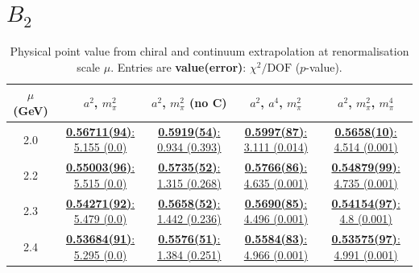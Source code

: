 \documentclass[12pt]{extarticle}
\begin{document}
\section{$B_2$}
\begin{table}[h!]
\begin{center}
\begin{tabular}{|c|c|c|c|c|}
\hline
$\mu$ (GeV) & $a^2$, $m_\pi^2$& $a^2$, $m_\pi^2$ (no C)& $a^2$, $a^4$, $m_\pi^2$& $a^2$, $m_\pi^2$, $m_\pi^4$\\
\hline
2.0& \hyperlink{VVmAA/SUSY/a2m2_20.pdf.1}{\textbf{0.56711(94)}: 5.155 (0.0)} & \hyperlink{VVmAA/SUSY/a2m2noC_20.pdf.1}{\textbf{0.5919(54)}: 0.934 (0.393)} & \hyperlink{VVmAA/SUSY/a2a4m2_20.pdf.1}{\textbf{0.5997(87)}: 3.111 (0.014)} & \hyperlink{VVmAA/SUSY/a2m2m4_20.pdf.1}{\textbf{0.5658(10)}: 4.514 (0.001)}\\
2.2& \hyperlink{VVmAA/SUSY/a2m2_22.pdf.1}{\textbf{0.55003(96)}: 5.515 (0.0)} & \hyperlink{VVmAA/SUSY/a2m2noC_22.pdf.1}{\textbf{0.5735(52)}: 1.315 (0.268)} & \hyperlink{VVmAA/SUSY/a2a4m2_22.pdf.1}{\textbf{0.5766(86)}: 4.635 (0.001)} & \hyperlink{VVmAA/SUSY/a2m2m4_22.pdf.1}{\textbf{0.54879(99)}: 4.735 (0.001)}\\
2.3& \hyperlink{VVmAA/SUSY/a2m2_23.pdf.1}{\textbf{0.54271(92)}: 5.479 (0.0)} & \hyperlink{VVmAA/SUSY/a2m2noC_23.pdf.1}{\textbf{0.5658(52)}: 1.442 (0.236)} & \hyperlink{VVmAA/SUSY/a2a4m2_23.pdf.1}{\textbf{0.5690(85)}: 4.496 (0.001)} & \hyperlink{VVmAA/SUSY/a2m2m4_23.pdf.1}{\textbf{0.54154(97)}: 4.8 (0.001)}\\
2.4& \hyperlink{VVmAA/SUSY/a2m2_24.pdf.1}{\textbf{0.53684(91)}: 5.295 (0.0)} & \hyperlink{VVmAA/SUSY/a2m2noC_24.pdf.1}{\textbf{0.5576(51)}: 1.384 (0.251)} & \hyperlink{VVmAA/SUSY/a2a4m2_24.pdf.1}{\textbf{0.5584(83)}: 4.966 (0.001)} & \hyperlink{VVmAA/SUSY/a2m2m4_24.pdf.1}{\textbf{0.53575(97)}: 4.991 (0.001)}\\
\hline
\end{tabular}
\caption{Physical point value from chiral and continuum extrapolation at renormalisation scale $\mu$. Entries are \textbf{value(error)}: $\chi^2/\text{DOF}$ ($p$-value).}
\end{center}
\end{table}
\end{document}
